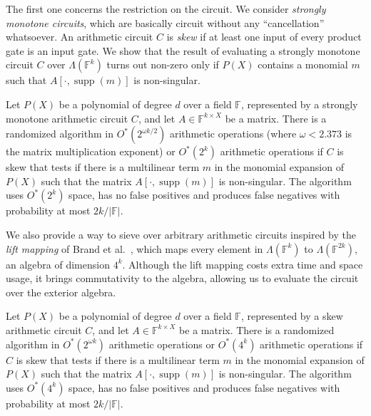 \documentclass{theoretics}
\newcommand{\F}{\ensuremath{\mathbb F}\xspace}
\DeclareMathOperator{\supp}{supp}
\begin{document}
The first one concerns the restriction on the circuit.
We consider \emph{strongly monotone circuits}, which are basically circuit without any ``cancellation'' whatsoever.
An arithmetic circuit $C$ is \emph{skew} if at least one input of every product gate is an input gate.
We show that the result of evaluating a strongly monotone circuit $C$ over $\Lambda(\F^k)$ turns out non-zero only if $P(X)$ contains a monomial $m$ such that $A[\cdot, \supp(m)]$ is non-singular. 



\begin{theorem} \label{ithm:smonotone}
  Let $P(X)$ be a polynomial of degree $d$ over a field $\F$, represented by a strongly monotone arithmetic circuit $C$,
  and let $A \in \F^{k \times X}$ be a
  matrix. There is a randomized algorithm
  in $O^*(2^{\omega k / 2})$ arithmetic operations (where $\omega < 2.373$ is
  the matrix multiplication exponent) or $O^*(2^k)$ arithmetic operations if $C$ is skew that tests if there is a multilinear
  term $m$ in the monomial expansion of $P(X)$ such that the matrix
  $A[\cdot,\supp(m)]$ is non-singular.
  The algorithm uses $O^*(2^k)$ space, 
  has no false positives and produces false negatives with probability
  at most $2k/|\F|$.
\end{theorem}

We also provide a way to sieve over arbitrary arithmetic circuits inspired by the \emph{lift mapping} of Brand et al.~\cite{BrandDH18}, which maps every  element in $\Lambda(\F^k)$ to $\Lambda(\F^{2k})$, an algebra of dimension $4^k$. 
Although the lift mapping costs extra time and space usage, it brings commutativity to the algebra, allowing us to evaluate the circuit over the exterior algebra.

\begin{theorem} \label{ithm:general}
  Let $P(X)$ be a polynomial of degree $d$ over a field $\F$, represented by a skew arithmetic circuit $C$,
  and let $A \in \F^{k \times X}$ be a
  matrix. There is a randomized algorithm
  in $O^*(2^{\omega k})$ arithmetic operations or $O^*(4^k)$ arithmetic operations if $C$ is skew that tests if there is a multilinear
  term $m$ in the monomial expansion of $P(X)$ such that the matrix
  $A[\cdot,\supp(m)]$ is non-singular.
  The algorithm uses $O^*(4^k)$ space, 
  has no false positives and produces false negatives with probability
  at most $2k/|\F|$.
\end{theorem}
\end{document}
